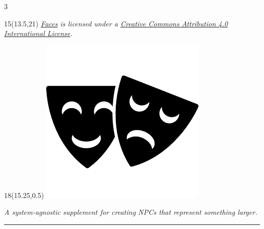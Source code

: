\documentclass[10pt,oneside,letterpaper,landscape]{memoir}
\newcommand*\toptitle[1]{{\color{titlecolor}\titlefont{#1}}}
\newlength{\currentparskip}
\newenvironment{mpage}[1]{%
        \setlength{\currentparskip}{\parskip}%
             \begin{minipage}{#1}%
         \setlength{\parskip}{\currentparskip}%
    }
{\end{minipage}}
\newcommand{\doublerule}[1][.4pt]{%
  \noindent\color{black!75}
  \makebox[0pt][l]{\rule[.7ex]{\linewidth}{#1}}%
  \rule[.3ex]{\linewidth}{#1}\color{black}\vspace{-1mm}}
\begin{document}
\begin{multicols}{3}

  \begin{textblock}{15}(13.5,21)
      \footnotesize
        \textit{\href{https://github.com/Astral-Frontier-Games/faces}{Faces} is licensed under a \href{https://creativecommons.org/licenses/by/4.0/}{Creative Commons Attribution 4.0 International License}.}
  \end{textblock}

\begin{textblock}{18}(15.25,0.5)
  \includegraphics[width=.15\textwidth]{images/theater-icon-29507.png}
\end{textblock}




\begin{mpage}{2.13\columnwidth}

 \hspace*{0mm}{\toptitle{Faces}}

\vspace{3mm}

\textit{A system-agnostic supplement for creating NPCs that represent something larger.}

\doublerule

\end{mpage}


\end{multicols}
\end{document}
